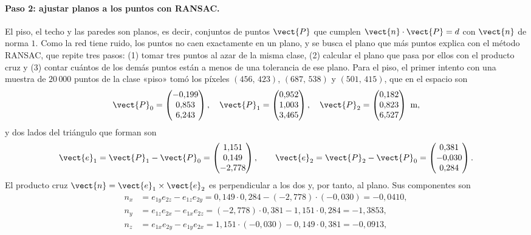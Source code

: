 \paragraph{Paso 2: ajustar planos a los puntos con RANSAC.} El piso, el techo y las paredes son planos, es decir, conjuntos de puntos $\vect{P}$ que cumplen
$\vect{n}\cdot\vect{P}=d$ con $\vect{n}$ de norma $1$. Como la red tiene ruido, los puntos no caen exactamente en un plano, y se busca el
plano que más puntos explica con el método RANSAC, que repite tres pasos:
(1) tomar tres puntos al azar de la misma clase, (2) calcular el plano que pasa por ellos con el producto cruz y (3) contar cuántos de los demás puntos
están a menos de una tolerancia de ese plano. Para el piso, el primer intento con una muestra de $20\,000$ puntos de la clase «piso» tomó los
píxeles $(456,\,423)$, $(687,\,538)$ y $(501,\,415)$, que en el espacio son
\begin{equation}
\vect{P}_0=\begin{pmatrix} -0{,}199 \\ 0{,}853 \\ 6{,}243 \end{pmatrix},\quad \vect{P}_1=\begin{pmatrix} 0{,}952 \\ 1{,}003 \\ 3{,}465 \end{pmatrix},\quad \vect{P}_2=\begin{pmatrix} 0{,}182 \\ 0{,}823 \\ 6{,}527 \end{pmatrix}\ \text{m},
\end{equation}
y dos lados del triángulo que forman son
\begin{equation}
\vect{e}_1=\vect{P}_1-\vect{P}_0=\begin{pmatrix} 1{,}151 \\ 0{,}149 \\ -2{,}778 \end{pmatrix},\qquad \vect{e}_2=\vect{P}_2-\vect{P}_0=\begin{pmatrix} 0{,}381 \\ -0{,}030 \\ 0{,}284 \end{pmatrix} .
\end{equation}
El producto cruz $\vect{n}=\vect{e}_1\times\vect{e}_2$ es perpendicular a los dos y, por tanto, al plano. Sus componentes son
\begin{align*}
n_x&=e_{1y}e_{2z}-e_{1z}e_{2y}=0{,}149\cdot0{,}284-\left(-2{,}778\right)\cdot\left(-0{,}030\right)=-0{,}0410,\\
n_y&=e_{1z}e_{2x}-e_{1x}e_{2z}=\left(-2{,}778\right)\cdot0{,}381-1{,}151\cdot0{,}284=-1{,}3853,\\
n_z&=e_{1x}e_{2y}-e_{1y}e_{2x}=1{,}151\cdot\left(-0{,}030\right)-0{,}149\cdot0{,}381=-0{,}0913,
\end{align*}
